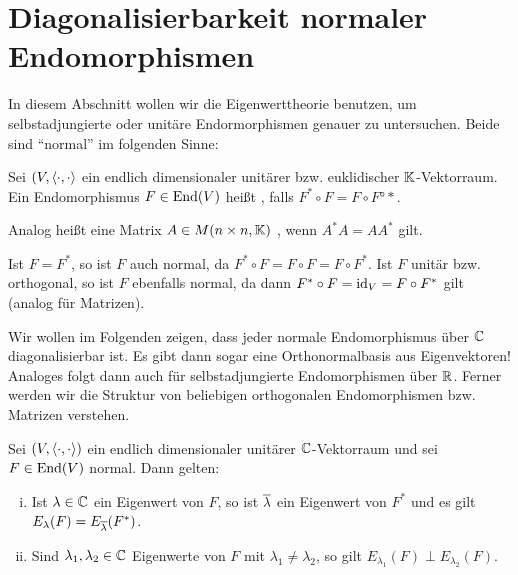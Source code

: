 \section{Diagonalisierbarkeit normaler Endomorphismen}
\label{sec:2.7}

In diesem Abschnitt wollen wir die Eigenwerttheorie benutzen, um selbstadjungierte oder unitäre Endormorphismen genauer zu untersuchen.
Beide sind \enquote{normal} im folgenden Sinne:

\begin{definition}
	\label{def:7.1}
	Sei $(V,\left\langle\cdot,\cdot\right\rangle$ ein endlich dimensionaler unitärer bzw. euklidischer $\mathbb{K}$-Vektorraum.
	Ein Endomorphismus $F \in \operatorname{End}(V)$ heißt , falls $F^* \circ F = F \circ F°*$.
	
	Analog heißt eine Matrix $A \in M(n \times n,\mathbb{K})$ , wenn $A^*A = AA^*$ gilt.
\end{definition}

Ist $F = F^*$, so ist $F$ auch normal, da $F^* \circ F = F \circ F = F \circ F^*$.
Ist $F$ unitär bzw. orthogonal, so ist $F$ ebenfalls normal, da dann $F^* \circ F = \operatorname{id}_V = F \circ F^*$ gilt (analog für Matrizen).

Wir wollen im Folgenden zeigen, dass jeder normale Endomorphismus über $\mathbb{C}$ diagonalisierbar ist.
Es gibt dann sogar eine Orthonormalbasis aus Eigenvektoren!
Analoges folgt dann auch für selbstadjungierte Endomorphismen über $\mathbb{R}$.
Ferner werden wir die Struktur von beliebigen orthogonalen Endomorphismen bzw. Matrizen verstehen.

\begin{lemma}
	\label{lemma:7.2}
	Sei $(V,\left\langle\cdot,\cdot\right\rangle)$ ein endlich dimensionaler unitärer $\mathbb{C}$-Vektorraum und sei $F \in \operatorname{End}(V)$ normal.
	Dann gelten:
	\begin{enumerate}[(i)]
		\item Ist $\lambda \in \mathbb{C}$ ein Eigenwert von $F$, so ist $\overline{\lambda}$ ein Eigenwert von $F^*$ und es gilt $E_\lambda(F) = E_{\overline{\lambda}}(F^*)$.
		\item Sind $\lambda_1,\lambda_2 \in \mathbb{C}$ Eigenwerte von $F$ mit $\lambda_1 \neq \lambda_2$, so gilt $E_{\lambda_1}(F) \perp E_{\lambda_2}(F)$.
	\end{enumerate}
\end{lemma}

